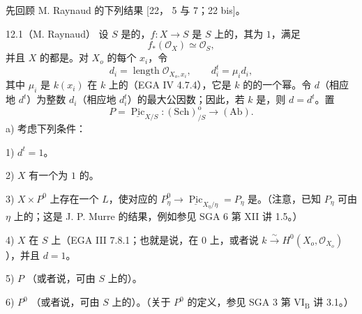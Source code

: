 
先回顾 M. Raynaud 的下列结果 [22， 5 与 7；22 bis]。

\begin{SGAresult}{}{12.1（M. Raynaud）}
设 $S$ 是的，$f:X\to S$ 是 $S$ 上的，其为 $1$，满足
\[
 f_*(\mathcal O_X)\simeq\mathcal O_S,\tag{12.1.1}
\]
并且 $X$ 的都是。对 $X_o$ 的每个 $x_i$，令
\[
 d_i=\operatorname{length}\mathcal O_{X_o,x_i},\qquad
 d_i^t=\mu_i d_i,\tag{12.1.2}
\]
其中 $\mu_i$ 是 $k(x_i)$ 在 $k$ 上的（EGA IV 4.7.4），它是 $k$ 的的一个幂。令 $d$（相应地 $d^t$）为整数 $d_i$（相应地 $d_i^t$）的最大公因数；因此，若 $k$ 是，则 $d=d^t$。置
\[
 P=\underline{\operatorname{Pic}}_{X/S}:(\mathrm{Sch})_{/S}^{\mathrm o}\longrightarrow(\mathrm{Ab}).\tag{12.1.3}
\]
\textup{a)} 考虑下列条件：

1) $d^t=1$。

2) $X$ 有一个为 $1$ 的。

3) $X\times P^0$ 上存在一个 $L$，使对应的
$P_\eta^0\to\underline{\operatorname{Pic}}_{X_\eta/\eta}=P_\eta$ 是。（注意，已知 $P_\eta$ 可由 $\eta$ 上的；这是 J. P. Murre 的结果，例如参见 SGA 6 第 XII 讲 1.5。）

4) $X$ 在 $S$ 上（EGA III 7.8.1；也就是说，在 $0$ 上，或者说 $k\xrightarrow\sim H^0(X_o,\mathcal O_{X_o})$），并且 $d=1$。

5) $P$ （或者说，可由 $S$ 上的）。

6) $P^0$ （或者说，可由 $S$ 上的）。（关于 $P^0$ 的定义，参见 SGA 3 第 VI$_{\mathrm B}$ 讲 3.1。）


\end{SGAresult}
